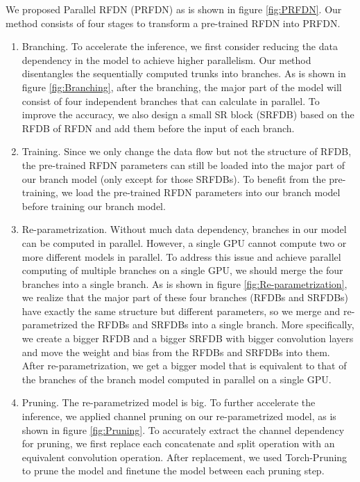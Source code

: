 \documentclass[10pt,twocolumn,letterpaper]{article}
\begin{document}
We proposed Parallel RFDN (PRFDN) as is shown in figure \ref{fig:PRFDN}.
Our method consists of four stages to transform a pre-trained RFDN\cite{liu2020residual} into PRFDN.
\begin{enumerate}
    \item Branching. To accelerate the inference, we first consider reducing the data dependency in the model to achieve higher parallelism. Our method disentangles the sequentially computed trunks into branches. As is shown in figure \ref{fig:Branching}, after the branching, the major part of the model will consist of four independent branches that can calculate in parallel. To improve the accuracy, we also design a small SR block (SRFDB) based on the RFDB of RFDN and add them before the input of each branch. 
    \item Training. Since we only change the data flow but not the structure of RFDB, the pre-trained RFDN parameters can still be loaded into the major part of our branch model (only except for those SRFDBs). To benefit from the pre-training, we load the pre-trained RFDN parameters into our branch model before training our branch model.
    \item Re-parametrization. Without much data dependency, branches in our model can be computed in parallel. However, a single GPU cannot compute two or more different models in parallel. To address this issue and achieve parallel computing of multiple branches on a single GPU, we should merge the four branches into a single branch. As is shown in figure \ref{fig:Re-parametrization}, we realize that the major part of these four branches (RFDBs and SRFDBs) have exactly the same structure but different parameters, so we merge and re-parametrized the RFDBs and SRFDBs into a single branch. More specifically, we create a bigger RFDB and a bigger SRFDB with bigger convolution layers and move the weight and bias from the RFDBs and SRFDBs into them. After re-parametrization, we get a bigger model that is equivalent to that of the branches of the branch model computed in parallel on a single GPU.
    \item Pruning. The re-parametrized model is big. To further accelerate the inference, we applied channel pruning on our re-parametrized model, as is shown in figure \ref{fig:Pruning}. To accurately extract the channel dependency for pruning, we first replace each concatenate and split operation with an equivalent convolution operation. After replacement, we used Torch-Pruning\cite{fang2023depgraph} to prune the model and finetune the model between each pruning step.
\end{enumerate}
\end{document}
